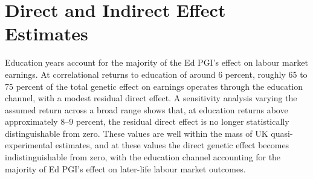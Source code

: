 \section{Direct and Indirect Effect Estimates}
\label{sec:direct-effects}

Education years account for the majority of the Ed PGI's effect on labour market earnings. At correlational returns to education of around 6 percent, roughly 65 to 75 percent of the total genetic effect on earnings operates through the education channel, with a modest residual direct effect.
A sensitivity analysis varying the assumed return across a broad range shows that, at education returns above approximately 8--9 percent, the residual direct effect is no longer statistically distinguishable from zero.
These values are well within the mass of UK quasi-experimental estimates, and at these values the direct genetic effect becomes indistinguishable from zero, with the education channel accounting for the majority of Ed PGI's effect on later-life labour market outcomes.

